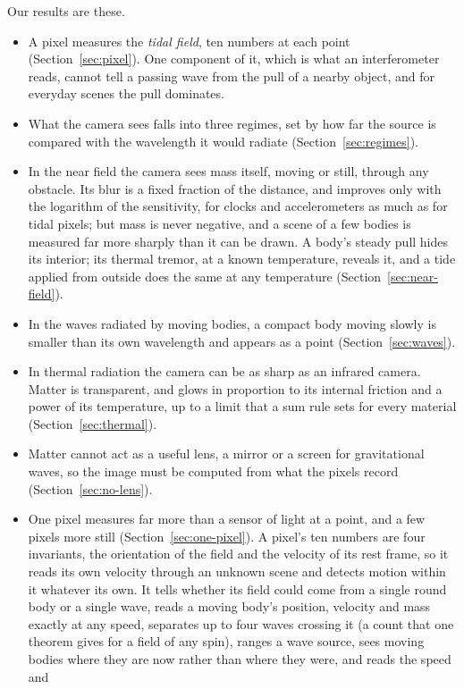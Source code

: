Our results are these.
\begin{itemize}
\item A pixel measures the \emph{tidal field}, ten numbers at each point
(Section~\ref{sec:pixel}). One component of it, which is what an interferometer reads, cannot tell a
passing wave from the pull of a nearby object, and for everyday scenes the pull
dominates.
\item What the camera sees falls into three regimes, set by how far the source
is compared with the wavelength it would radiate (Section~\ref{sec:regimes}).
\item In the near field the camera sees mass itself, moving or still, through
any obstacle. Its blur is a fixed fraction of the distance, and improves only
with the logarithm of the sensitivity, for clocks and accelerometers as much as
for tidal pixels; but mass is never negative, and a scene of a few bodies is
measured far more sharply than it can be drawn. A body's steady pull hides its
interior; its thermal tremor, at a known temperature, reveals it, and a tide
applied from outside does the same at any temperature (Section~\ref{sec:near-field}).
\item In the waves radiated by moving bodies, a compact body moving slowly is
smaller than its own wavelength and appears as a point
(Section~\ref{sec:waves}).
\item In thermal radiation the camera can be as sharp as an infrared camera.
Matter is transparent, and glows in proportion to its internal friction and a
power of its temperature, up to a limit that a sum rule sets for every material
(Section~\ref{sec:thermal}).
\item Matter cannot act as a useful lens, a mirror or a screen for gravitational
waves, so the image must be computed from what the pixels record
(Section~\ref{sec:no-lens}).
\item One pixel measures far more than a sensor of light at a point, and a few
pixels more still (Section~\ref{sec:one-pixel}). A pixel's ten numbers are four
invariants, the orientation of the field and the velocity of its rest frame, so
it reads its own velocity through an unknown scene and detects motion within it
whatever its own. It tells whether its field could come from a single round
body or a single wave, reads a moving body's position, velocity and mass exactly at any
speed, separates up to four waves crossing it (a count that one theorem gives
for a field of any spin), ranges a wave source, sees moving
bodies where they are now rather than where they were, and reads the speed and

\end{itemize}
